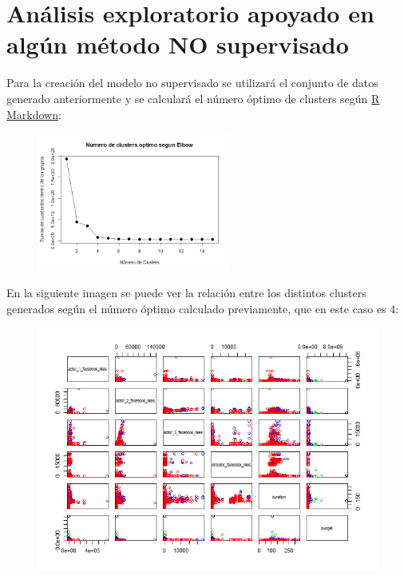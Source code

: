 \documentclass{article}
\begin{document}
\section{Análisis exploratorio apoyado en algún método NO supervisado}

Para la creación del modelo no supervisado se utilizará el conjunto de datos generado anteriormente y se calculará el número óptimo de clusters según \href{https://github.com/pozueco/proyecto_fin_de_master/blob/master/model_no_supervised.md}{R Markdown}:

\begin{figure}[h]
\centering
\includegraphics[width=2.5in,clip,keepaspectratio]{./model_no_supervised_files/figure-markdown_github/unnamed-chunk-2-1}
\end{figure}

En la siguiente imagen se puede ver la relación entre los distintos clusters generados según el número óptimo calculado previamente, que en este caso es 4:

\begin{figure}[h]
\centering
\includegraphics[width=5in,clip,keepaspectratio]{./model_no_supervised_files/figure-markdown_github/unnamed-chunk-2-2}
\end{figure}
\end{document}
